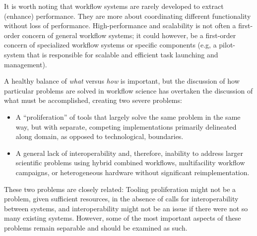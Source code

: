 It is worth noting that workflow systems are rarely developed to extract
(enhance) performance. They are more about coordinating different
functionality without loss of performance. High-performance and scalability is
not often a first-order concern of general workflow systems; it could however,
be a first-order concern of specialized workflow systems or specific
components (e.g, a pilot-system that is responsible for scalable and efficient
task launching and management).

A healthy balance of \textit{what} versus \textit{how} is
important, but the discussion of how particular problems are
solved in workflow science has overtaken the discussion of what must be
accomplished, creating two severe problems: 
\begin{itemize} 
  \item A ``proliferation'' of tools that largely solve the same problem in the
  same way, but with separate, competing implementations primarily delineated
  along domain, as opposed to technological, boundaries.  
  \item A general lack of interoperability and, therefore, inability to address
  larger scientific problems using hybrid combined workflows, multifacility
  workflow campaigns, or heterogeneous hardware without significant
  reimplementation.
\end{itemize}

These two problems are closely related: Tooling proliferation might not be a
problem, given sufficient resources, in the absence of calls for
interoperability between systems, and interoperability might not be an issue if
there were not so many existing systems. However, some of the most important
aspects of these problems remain separable and should be examined as such.





